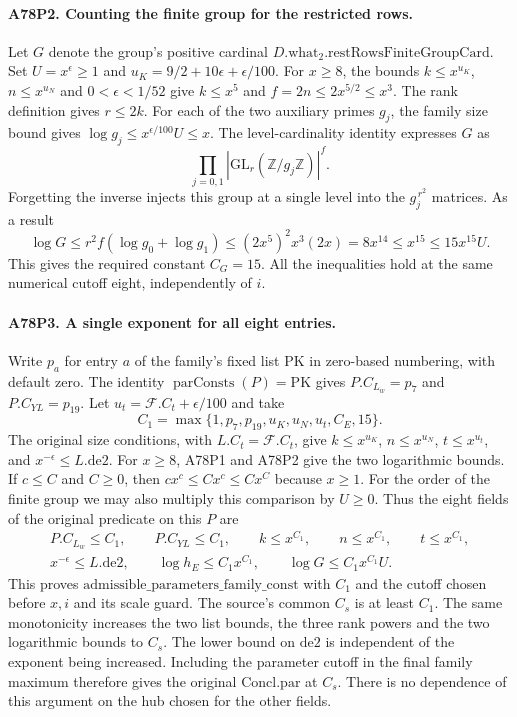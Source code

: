 \paragraph{A78P2. Counting the finite group for the restricted rows.}
Let $G$ denote the group's positive cardinal
$D.\mathrm{what}_2.\mathrm{restRowsFiniteGroupCard}$. Set
$U=x^\epsilon\ge1$ and $u_K=9/2+10\epsilon+\epsilon/100$.
For $x\ge8$, the bounds $k\le x^{u_K}$, $n\le x^{u_N}$ and
$0<\epsilon<1/52$ give $k\le x^5$ and $f=2n\le2x^{5/2}\le x^3$.
The rank definition gives $r\le2k$. For each of the two auxiliary
primes $g_j$, the family size bound gives
$\log g_j\le x^{\epsilon/100}U\le x$. The level-cardinality
identity expresses $G$ as
\[
     \prod_{j=0,1}|\mathrm{GL}_r(\mathbb Z/g_j\mathbb Z)|^f .
\]
Forgetting the inverse injects this group at a single level into
the $g_j^{\,r^2}$ matrices. As a result
\[
 \log G\le r^2f(\log g_0+\log g_1)
          \le (2x^5)^2x^3(2x)
          =8x^{14}\le x^{15}\le15x^{15}U .
\]
This gives the required constant $C_G=15$. All the inequalities
hold at the same numerical cutoff eight, independently of $i$.

\paragraph{A78P3. A single exponent for all eight entries.}
Write $p_a$ for entry $a$ of the family's fixed list $\mathrm{PK}$
in zero-based numbering, with default zero. The identity
$\operatorname{parConsts}(P)=\mathrm{PK}$ gives $P.C_{L_w}=p_7$
and $P.C_{YL}=p_{19}$. Let $u_t=\mathcal F.C_t+\epsilon/100$ and take
\[
 C_1=\max\{1,p_7,p_{19},u_K,u_N,u_t,C_E,15\}.
\]
The original size conditions, with $L.C_t=\mathcal F.C_t$, give
$k\le x^{u_K}$, $n\le x^{u_N}$, $t\le x^{u_t}$, and
$x^{-\epsilon}\le L.\mathrm{de2}$. For $x\ge8$, A78P1 and A78P2
give the two logarithmic bounds. If $c\le C$ and $C\ge0$, then
$c x^c\le Cx^c\le Cx^C$ because $x\ge1$. For the order of the
finite group we may also multiply this comparison by $U\ge0$.
Thus the eight fields of the original predicate on this $P$ are
\[
 \begin{gathered}
 P.C_{L_w}\le C_1,\qquad P.C_{YL}\le C_1,\qquad
 k\le x^{C_1},\qquad n\le x^{C_1},\qquad t\le x^{C_1},\\
 x^{-\epsilon}\le L.\mathrm{de2},\qquad
 \log h_E\le C_1x^{C_1},\qquad \log G\le C_1x^{C_1}U .
 \end{gathered}
\]
This proves $\mathrm{admissible\_parameters\_family\_const}$ with
$C_1$ and the cutoff chosen before $x,i$ and its scale guard.
The source's common $C_s$ is at least $C_1$. The same monotonicity
increases the two list bounds, the three rank powers and the two
logarithmic bounds to $C_s$. The lower bound on $\mathrm{de2}$ is
independent of the exponent being increased. Including the
parameter cutoff in the final family maximum therefore gives the
original $\mathrm{Concl.par}$ at $C_s$. There is no dependence of
this argument on the hub chosen for the other fields.
